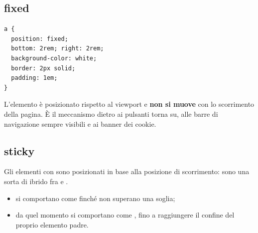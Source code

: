 \subsection{fixed}

\begin{affianco}[0.45]
\begin{lstlisting}[style=css, name=fixed.css]
a {
  position: fixed;
  bottom: 2rem; right: 2rem;
  background-color: white;
  border: 2px solid;
  padding: 1em;
}
\end{lstlisting}
\risultato
\begin{browser}
\end{browser}
\end{affianco}

L'elemento è posizionato rispetto al viewport e \textbf{non si muove} con lo
scorrimento della pagina. È il meccanismo dietro ai pulsanti \guillemotleft torna
su\guillemotright, alle barre di navigazione sempre visibili e ai banner dei cookie.

\subsection{sticky}

Gli elementi con  sono posizionati in base alla posizione
di scorrimento: sono una sorta di ibrido fra  e .

\begin{itemize}
  \item si comportano come  finché non superano una soglia;
  \item da quel momento si comportano come , fino a raggiungere il
        confine del proprio elemento padre.
\end{itemize}

